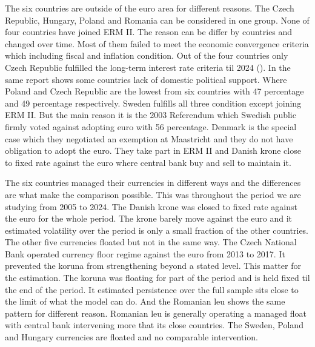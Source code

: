 \vspace{\baselineskip}

The six countries are outside of the euro area for different reasons. 
The Czech Republic, Hungary, Poland and Romania can be considered in one group.
None of four countries have joined ERM II.
The reason can be differ by countries and changed over time.
Most of them failed to meet the economic convergence criteria which including fiscal and inflation condition.
Out of the four countries only Czech Republic fulfilled the long-term interest rate criteria til 2024 (\cite{european_commission_european_2024}).
In the same report shows some countries lack of domestic political support.
Where Poland and Czech Republic are the lowest from six countries with 47 percentage and 49 percentage respectively.
Sweden fulfills all three condition except joining ERM II.
But the main reason it is the 2003 Referendum which Swedish public firmly voted against adopting euro with 56 percentage.
Denmark is the special case which they negotiated an exemption at Maastricht and they do not have obligation to adopt the euro.
They take part in ERM II and Danish krone close to fixed rate against the euro where central bank buy and sell to maintain it.

\vspace{\baselineskip}

The six countries managed their currencies in different ways and the differences are what make the comparison possible.
This was throughout the period we are studying from 2005 to 2024.
The Danish krone was closed to fixed rate against the euro for the whole period.
The krone barely move against the euro and it estimated volatility over the period is only a small fraction of the other countries.
The other five currencies floated but not in the same way.
The Czech National Bank operated currency floor regime against the euro from 2013 to 2017.
It prevented the koruna from strengthening beyond a stated level. 
This matter for the estimation.
The koruna was floating for part of the period and is held fixed til the end of the period.
It estimated persistence over the full sample sits close to the limit of what the model can do.
And the Romanian leu shows the same pattern for different reason.
Romanian leu is generally operating a managed float with central bank intervening more that its close countries.
The Sweden, Poland and Hungary currencies are floated and no comparable intervention.

\vspace{\baselineskip}

